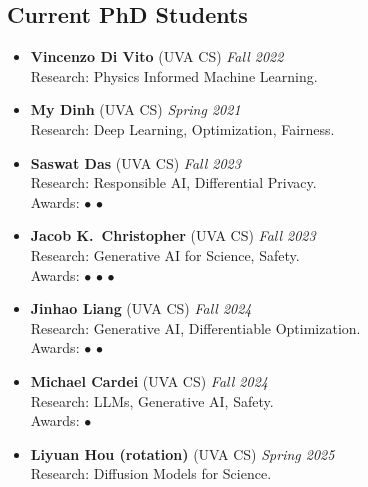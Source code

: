 \medskip

\subsection*{Current PhD Students}
\begin{itemize}

  \item \textbf{Vincenzo Di Vito} ({\sc UVA} CS)
  \hfill{\em Fall 2022}\\
  {\sc Research:} Physics Informed Machine Learning.
  
  \item \textbf{My Dinh} ({\sc UVA} CS) 
  \hfill{\em Spring 2021}\\
  {\sc Research}: Deep Learning, Optimization, Fairness.

  \item \textbf{Saswat Das} ({\sc UVA} CS)
  \hfill{\em Fall 2023}\\
  {\sc Research:} Responsible AI, Differential Privacy.\\
  {\sc Awards:} 
  $\bullet$ 
  $\bullet$ 

  \item \textbf{Jacob K.~Christopher} ({\sc UVA} CS)
  \hfill{\em Fall 2023}\\
  {\sc Research:} Generative AI for Science, Safety.\\
  {\sc Awards:} 
  $\bullet$  
  $\bullet$ 
  $\bullet$ 

  \item \textbf{Jinhao Liang} ({\sc UVA} CS)
  \hfill{\em Fall 2024}\\
  {\sc Research:} Generative AI, Differentiable Optimization.\\
  {\sc Awards:} 
  $\bullet$ 
  $\bullet$ 
  
  \item \textbf{Michael Cardei} ({\sc UVA} CS)
  \hfill{\em Fall 2024}\\
  {\sc Research:} LLMs, Generative AI, Safety.\\
  {\sc Awards:} $\bullet$ 

  \item \textbf{Liyuan Hou (rotation)} ({\sc UVA} CS)
  \hfill{\em Spring 2025}\\
  {\sc Research:} Diffusion Models for Science.
  

\end{itemize}

